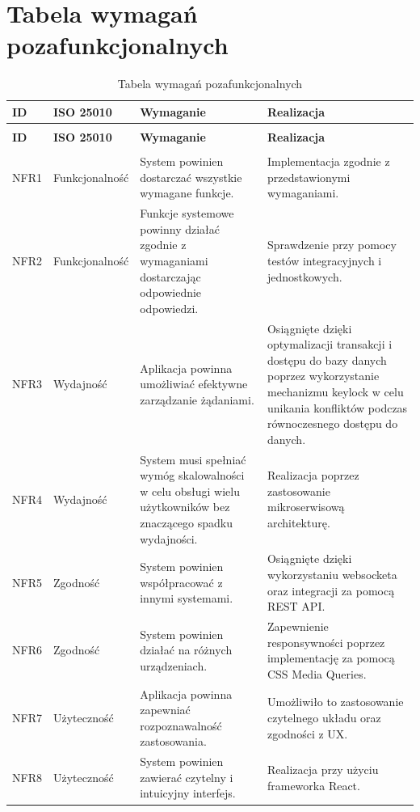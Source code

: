 \section{Tabela wymagań pozafunkcjonalnych}
\small{
\begin{longtable}{|p{1cm}|p{2.5cm}|p{4.5cm}|p{5cm}|}
    \hline
    \textbf{ID} & \textbf{ISO 25010} & \textbf{Wymaganie} & \textbf{Realizacja} \\
    \hline
    \endfirsthead
    \caption[]{Tabela wymagań pozafunkcjonalnych -- ciąg dalszy} \\
    \hline
    \textbf{ID} & \textbf{ISO 25010} & \textbf{Wymaganie} & \textbf{Realizacja} \\
    \hline
    \endhead
    \hline
    \endfoot
    \hline
    \caption{Tabela wymagań pozafunkcjonalnych} \label{tab:NFR-table} \\
    \endlastfoot
    NFR1 & Funkcjonalność & System powinien dostarczać wszystkie wymagane funkcje. & Implementacja zgodnie z przedstawionymi wymaganiami.\\
    \hline
    NFR2 & Funkcjonalność & Funkcje systemowe powinny działać zgodnie z wymaganiami dostarczając odpowiednie odpowiedzi. & Sprawdzenie przy pomocy testów integracyjnych i jednostkowych. \\
    \hline
    NFR3 & Wydajność & Aplikacja powinna umożliwiać efektywne zarządzanie żądaniami. &  Osiągnięte dzięki optymalizacji transakcji i dostępu do bazy danych poprzez wykorzystanie mechanizmu keylock w celu unikania konfliktów podczas równoczesnego dostępu do danych. \\
    \hline
    NFR4 & Wydajność & System musi spełniać wymóg skalowalności w celu obsługi wielu użytkowników bez znaczącego spadku wydajności. & Realizacja poprzez zastosowanie mikroserwisową architekturę. \\
    \hline
    NFR5 & Zgodność & System powinien współpracować z innymi systemami. & Osiągnięte dzięki wykorzystaniu websocketa oraz integracji za pomocą REST API. \\
    \hline
    NFR6 & Zgodność & System powinien działać na różnych urządzeniach. & Zapewnienie responsywności poprzez implementację za pomocą CSS Media Queries. \\
    \hline
    NFR7 & Użyteczność & Aplikacja powinna zapewniać rozpoznawalność zastosowania. & Umożliwiło to zastosowanie czytelnego układu oraz zgodności z UX. \\
    \hline
    NFR8 & Użyteczność & System powinien zawierać czytelny i intuicyjny interfejs. & Realizacja przy użyciu frameworka React. \\

\end{longtable}}
